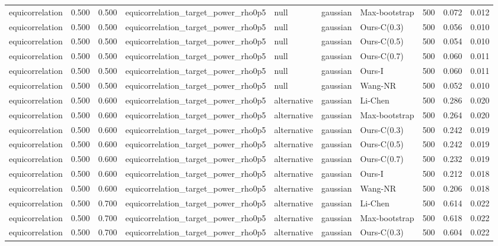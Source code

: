 \begin{tabular}{lrrllllrrr}
equicorrelation & 0.500 & 0.500 & equicorrelation\_target\_power\_rho0p5 & null & gaussian & Max-bootstrap & 500 & 0.072 & 0.012 \\
equicorrelation & 0.500 & 0.500 & equicorrelation\_target\_power\_rho0p5 & null & gaussian & Ours-C(0.3) & 500 & 0.056 & 0.010 \\
equicorrelation & 0.500 & 0.500 & equicorrelation\_target\_power\_rho0p5 & null & gaussian & Ours-C(0.5) & 500 & 0.054 & 0.010 \\
equicorrelation & 0.500 & 0.500 & equicorrelation\_target\_power\_rho0p5 & null & gaussian & Ours-C(0.7) & 500 & 0.060 & 0.011 \\
equicorrelation & 0.500 & 0.500 & equicorrelation\_target\_power\_rho0p5 & null & gaussian & Ours-I & 500 & 0.060 & 0.011 \\
equicorrelation & 0.500 & 0.500 & equicorrelation\_target\_power\_rho0p5 & null & gaussian & Wang-NR & 500 & 0.052 & 0.010 \\
equicorrelation & 0.500 & 0.600 & equicorrelation\_target\_power\_rho0p5 & alternative & gaussian & Li-Chen & 500 & 0.286 & 0.020 \\
equicorrelation & 0.500 & 0.600 & equicorrelation\_target\_power\_rho0p5 & alternative & gaussian & Max-bootstrap & 500 & 0.264 & 0.020 \\
equicorrelation & 0.500 & 0.600 & equicorrelation\_target\_power\_rho0p5 & alternative & gaussian & Ours-C(0.3) & 500 & 0.242 & 0.019 \\
equicorrelation & 0.500 & 0.600 & equicorrelation\_target\_power\_rho0p5 & alternative & gaussian & Ours-C(0.5) & 500 & 0.242 & 0.019 \\
equicorrelation & 0.500 & 0.600 & equicorrelation\_target\_power\_rho0p5 & alternative & gaussian & Ours-C(0.7) & 500 & 0.232 & 0.019 \\
equicorrelation & 0.500 & 0.600 & equicorrelation\_target\_power\_rho0p5 & alternative & gaussian & Ours-I & 500 & 0.212 & 0.018 \\
equicorrelation & 0.500 & 0.600 & equicorrelation\_target\_power\_rho0p5 & alternative & gaussian & Wang-NR & 500 & 0.206 & 0.018 \\
equicorrelation & 0.500 & 0.700 & equicorrelation\_target\_power\_rho0p5 & alternative & gaussian & Li-Chen & 500 & 0.614 & 0.022 \\
equicorrelation & 0.500 & 0.700 & equicorrelation\_target\_power\_rho0p5 & alternative & gaussian & Max-bootstrap & 500 & 0.618 & 0.022 \\
equicorrelation & 0.500 & 0.700 & equicorrelation\_target\_power\_rho0p5 & alternative & gaussian & Ours-C(0.3) & 500 & 0.604 & 0.022 \\

\end{tabular}
